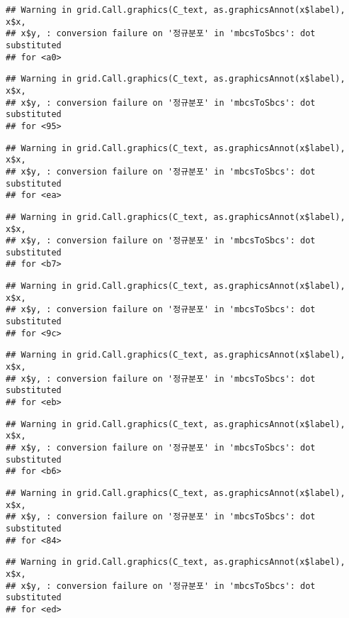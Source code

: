 \documentclass[]{book}
\begin{document}
\begin{verbatim}
## Warning in grid.Call.graphics(C_text, as.graphicsAnnot(x$label), x$x,
## x$y, : conversion failure on '정규분포' in 'mbcsToSbcs': dot substituted
## for <a0>
\end{verbatim}

\begin{verbatim}
## Warning in grid.Call.graphics(C_text, as.graphicsAnnot(x$label), x$x,
## x$y, : conversion failure on '정규분포' in 'mbcsToSbcs': dot substituted
## for <95>
\end{verbatim}

\begin{verbatim}
## Warning in grid.Call.graphics(C_text, as.graphicsAnnot(x$label), x$x,
## x$y, : conversion failure on '정규분포' in 'mbcsToSbcs': dot substituted
## for <ea>
\end{verbatim}

\begin{verbatim}
## Warning in grid.Call.graphics(C_text, as.graphicsAnnot(x$label), x$x,
## x$y, : conversion failure on '정규분포' in 'mbcsToSbcs': dot substituted
## for <b7>
\end{verbatim}

\begin{verbatim}
## Warning in grid.Call.graphics(C_text, as.graphicsAnnot(x$label), x$x,
## x$y, : conversion failure on '정규분포' in 'mbcsToSbcs': dot substituted
## for <9c>
\end{verbatim}

\begin{verbatim}
## Warning in grid.Call.graphics(C_text, as.graphicsAnnot(x$label), x$x,
## x$y, : conversion failure on '정규분포' in 'mbcsToSbcs': dot substituted
## for <eb>
\end{verbatim}

\begin{verbatim}
## Warning in grid.Call.graphics(C_text, as.graphicsAnnot(x$label), x$x,
## x$y, : conversion failure on '정규분포' in 'mbcsToSbcs': dot substituted
## for <b6>
\end{verbatim}

\begin{verbatim}
## Warning in grid.Call.graphics(C_text, as.graphicsAnnot(x$label), x$x,
## x$y, : conversion failure on '정규분포' in 'mbcsToSbcs': dot substituted
## for <84>
\end{verbatim}

\begin{verbatim}
## Warning in grid.Call.graphics(C_text, as.graphicsAnnot(x$label), x$x,
## x$y, : conversion failure on '정규분포' in 'mbcsToSbcs': dot substituted
## for <ed>
\end{verbatim}
\end{document}
